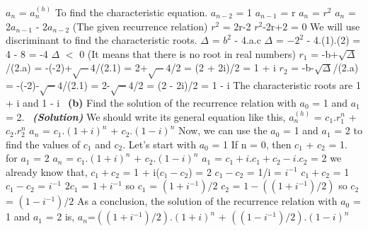 \documentclass[a4 paper]{article}
\numberwithin{equation}{section}
\newcommand{\subproblem}[1]{~\newline\textbf{(#1)}}
\newcommand{\solution}{~\newline\textbf{\textit{(Solution)}} }
\newcommand{\0}{\mathbf{0}}
\begin{document}
\newline
$a_n$ = $a_n^{(h)}$
\newline
To find the characteristic equation.
\newline
$a_{n-2}$ = 1
\newline
$a_{n-1}$ = r
\newline
$a_n$ = $r^2$
\newline
$a_n$ = 2$a_{n-1}$ - 2$a_{n-2}$ (The given recurrence relation)
\newline
$r^2$ = 2r-2
\newline
$r^2$-2r+2 = 0
\newline
We will use discriminant to find the characteristic roots.
\newline
$\Delta$ = $b^2$ - 4.a.c
\newline
$\Delta$ = $-2^2$ - 4.(1).(2) = 4 - 8 = -4
\newline
$\Delta$ $<$ 0 (It means that there is no root in real numbers)
\newline
$r_1$ = -b+$\sqrt\Delta$/(2.a) = -(-2)+$\sqrt-4$/(2.1) = 2+$\sqrt-4$/2 = (2 + 2i)/2 = 1 + i
\newline
$r_2$ = -b-$\sqrt\Delta$/(2.a) = -(-2)-$\sqrt-4$/(2.1) = 2-$\sqrt-4$/2 = (2 - 2i)/2 = 1 - i
\newline
The characteristic roots are 1 + i and 1 - i
\newline
\newline
\subproblem{b} Find the solution of the recurrence relation with $a_0$ = 1 and $a_1$ = 2.
\solution
\newline
We should write its general equation like this,
\newline
$a_n^{(h)}$ = $c_1$.$r_1^n$ + $c_2$.$r_2^n$ 
\newline
$a_n$ = $c_1$.$(1 + i)^n$ + $c_2$.$(1 - i)^n$ 
\newline
Now, we can use the $a_0$ = 1 and $a_1$ = 2 to find the values of $c_1$ and  $c_2$.
\newline
Let's start with $a_0$ = 1
If n = 0, then $c_1$ + $c_2$ = 1.
\newline
for $a_1$ = 2
\newline
$a_n$ = $c_1.(1 + i)^n$ + $c_2.(1 - i)^n$
\newline
$a_1$ = $c_1 + i.c_1 + c_2 - i.c_2$ = 2
\newline
we already know that,
\newline
$c_1 + c_2$ = 1
 + i($c_1 - c_2$) = 2
\newline
$c_1 - c_2$ = 1/i = $i^{-1}$
\newline
$c_1 + c_2$ = 1
\newline
$c_1 - c_2$ = $i^{-1}$
\newline
$2c_1$ = $1 + i^{-1}$ so $c_1$ = $(1 + i^{-1})/2$
\newline
$c_2$ = $1 - ((1 + i^{-1})/2)$ so $c_2$ = $(1 - i^{-1})/2$
\newline
As a conclusion, the solution of the recurrence relation with $a_0$ = 1 and $a_1$ = 2 is,
\newline
$a_n$=$((1 + i^{-1})/2)$.$(1 + i)^n$ + $((1 - i^{-1})/2)$.$(1 - i)^n$ 
\newline
\end{document}
